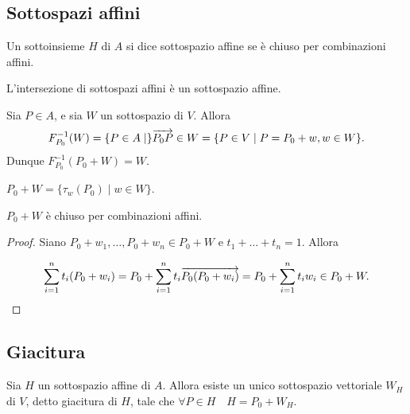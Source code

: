 	\subsection{Sottospazi affini}
 
 Un sottoinsieme $H$ di $A$ si dice sottospazio affine se è chiuso per combinazioni affini.
 
 \vspace{0.5cm}
 
 \begin{remark}
 L'intersezione di sottospazi affini è un sottospazio affine.
 \end{remark}
 
 \vspace{0.5cm}
 
 \begin{example}
 Sia $P\in A$, e sia $W$ un sottospazio di $V.$ Allora
 $$F^{-1}_{P_0}(W)=\{P\in A\;|\}\overrightarrow{P_0P}\in W=\{P\in V\;|\;P=P_0+w, w\in W\}.$$
 Dunque $F^{-1}_{P_0}(P_0+W)=W$.
 \end{example}
 
 \vspace{0.5cm}
 
 \begin{remark}
 $P_0+W=\{\tau_w(P_0)\;|\;w\in W\}$.
 \end{remark}
 
 \vspace{0.5cm}
 
 \begin{proposition}
 $P_0+W$ è chiuso per combinazioni affini.
 \end{proposition}
 
 \begin{proof}
 Siano $P_0+w_1,\dots,P_0+w_n\in P_0+W$ e $t_1+\ldots+t_n=1$. Allora
 
 \[
	\sum_{i=1}^nt_i(P_0+w_i)=P_0+\sum_{i=1}^nt_i\overrightarrow{P_0(P_0+w_i)}=P_0+\sum_{i=1}^nt_iw_i\in P_0+W.
 \]
 \end{proof}
 
 \subsection{Giacitura}
 
 \begin{proposition}
 Sia $H$ un sottospazio affine di $A$. Allora esiste un unico sottospazio vettoriale
 $W_H$ di $V$,  detto giacitura di $H$, tale che $\forall P\in H\quad H=P_0+W_H$.
 \end{proposition}
 
